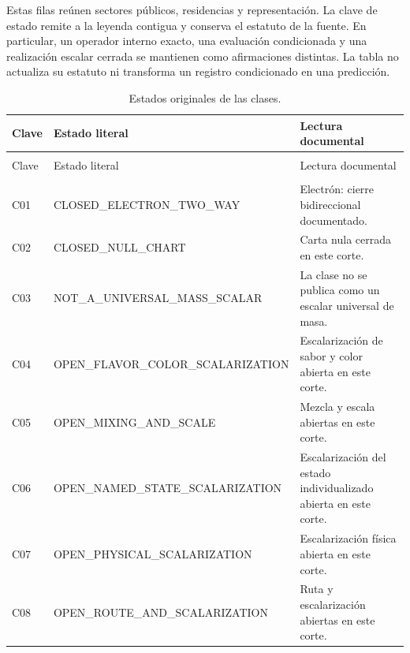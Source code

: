 Estas filas reúnen sectores públicos, residencias y representación. La clave
de estado remite a la leyenda contigua y conserva el estatuto de la fuente.
En particular, un operador interno exacto, una evaluación condicionada y una
realización escalar cerrada se mantienen como afirmaciones distintas. La tabla
no actualiza su estatuto ni transforma un registro condicionado en una predicción.

\begingroup
\setlength{\tabcolsep}{4pt}
\setlength{\extrarowheight}{4pt}
\renewcommand{\arraystretch}{1.13}
\begin{longtable}{@{}>{\raggedright\arraybackslash}p{}>{\raggedright\arraybackslash}p{}>{\raggedright\arraybackslash}p{}@{}}
\caption{Estados originales de las clases.}\label{tab:vi-estados-clases}\\
\toprule
Clave & Estado literal & Lectura documental \\
\midrule
\endfirsthead
\multicolumn{3}{l}{\textit{Continuación}}\\
\toprule
Clave & Estado literal & Lectura documental \\
\midrule
\endhead
\midrule
\multicolumn{3}{r}{Continúa en la página siguiente}\\
\endfoot
\bottomrule
\endlastfoot
C01 & CLOSED\_\allowbreak{}ELECTRON\_\allowbreak{}TWO\_\allowbreak{}WAY & Electrón: cierre bidireccional documentado. \\
C02 & CLOSED\_\allowbreak{}NULL\_\allowbreak{}CHART & Carta nula cerrada en este corte. \\
C03 & NOT\_\allowbreak{}A\_\allowbreak{}UNIVERSAL\_\allowbreak{}MASS\_\allowbreak{}SCALAR & La clase no se publica como un escalar universal de masa. \\
C04 & OPEN\_\allowbreak{}FLAVOR\_\allowbreak{}COLOR\_\allowbreak{}SCALARIZATION & Escalarización de sabor y color abierta en este corte. \\
C05 & OPEN\_\allowbreak{}MIXING\_\allowbreak{}AND\_\allowbreak{}SCALE & Mezcla y escala abiertas en este corte. \\
C06 & OPEN\_\allowbreak{}NAMED\_\allowbreak{}STATE\_\allowbreak{}SCALARIZATION & Escalarización del estado individualizado abierta en este corte. \\
C07 & OPEN\_\allowbreak{}PHYSICAL\_\allowbreak{}SCALARIZATION & Escalarización física abierta en este corte. \\
C08 & OPEN\_\allowbreak{}ROUTE\_\allowbreak{}AND\_\allowbreak{}SCALARIZATION & Ruta y escalarización abiertas en este corte. \\
\end{longtable}
\endgroup

